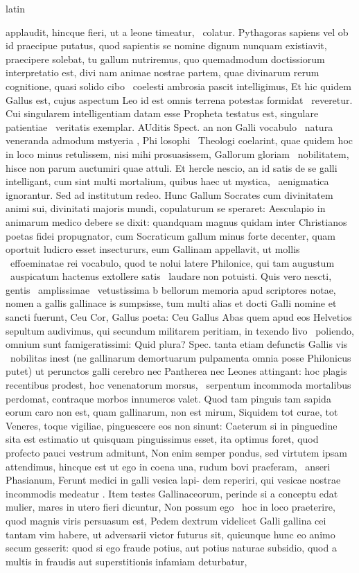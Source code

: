 \documentclass[12pt]{book}
\renewenvironment{latin}
    	{\begin{hyphenrules}{latin}}
    	{\end{hyphenrules}}
\begin{document}
\begin{pages}
\begin{latin}
\begin{Leftside}
applaudit, hincque fieri, ut a leone timeatur, ﻿\ampersand\ colatur. Pythagoras sapiens vel ob id praecipue putatus, quod sapientis se nomine dignum nunquam existiavit, praecipere solebat, tu gallum nutriremus, quo quemadmodum doctissiorum interpretatio est, divi nam animae nostrae partem, quae divinarum rerum cognitione, quasi solido cibo ﻿\ampersand\ coelesti ambrosia pascit intelligimus, Et hic quidem Gallus est, cujus aspectum Leo id est omnis terrena potestas formidat ﻿\ampersand\ reveretur. Cui singularem intelligentiam datam esse Propheta testatus est, singulare patientiae ﻿\ampersand\ veritatis exemplar. AUditis Spect. an non Galli vocabulo ﻿\ampersand\ natura veneranda admodum mstyeria , Phi   losophi ﻿\ampersand\ Theologi coelarint, quae quidem hoc in loco minus retulissem, nisi mihi prosuasissem, Gallorum gloriam ﻿\ampersand\ nobilitatem, hisce non parum auctumiri quae attuli. Et hercle nescio, an id satis de se galli intelligant, cum sint multi mortalium, quibus haec ut mystica, ﻿\ampersand\ aenigmatica ignorantur. Sed ad institutum redeo. Hunc Gallum Socrates cum divinitatem animi sui, divinitati majoris mundi, copulaturum se speraret: Aesculapio in animarum medico debere se dixit: quandquam magnus quidam inter Christianos poetas fidei propugnator, cum Socraticum gallum minus forte decenter, quam oportuit ludicro esset insectururs, eum Gallinam appellavit, ut mollis ﻿\ampersand\ effoeminatae rei vocabulo, quod te nolui latere Philonice, qui tam augustum ﻿\ampersand\ auspicatum hactenus extollere satis ﻿\ampersand\ laudare non potuisti. Quis vero nescti, gentis ﻿\ampersand\ amplissimae ﻿\ampersand\ vetustissima b bellorum memoria apud scriptores notae, nomen a gallis gallinace is sumpsisse, tum multi alias et docti Galli nomine et sancti fuerunt, Ceu Cor, Gallus poeta: Ceu Gallus Abas quem apud eos Helvetios sepultum audivimus, qui secundum militarem peritiam, in texendo livo ﻿\ampersand\ poliendo, omnium sunt famigeratissimi: Quid plura? Spec. tanta etiam defunctis Gallis vis ﻿\ampersand\ nobilitas inest (ne gallinarum demortuarum pulpamenta omnia posse Philonicus putet) ut perunctos galli cerebro nec Pantherea nec Leones attingant: hoc plagis recentibus prodest, hoc venenatorum morsus, ﻿\ampersand\ serpentum incommoda mortalibus perdomat, contraque morbos innumeros valet. Quod tam pinguis tam sapida eorum caro non est, quam gallinarum, non est mirum, Siquidem tot curae, tot Veneres, toque vigiliae, pinguescere eos non sinunt: Caeterum si in pinguedine sita est estimatio ut quisquam pinguissimus esset, ita optimus foret, quod profecto pauci vestrum admitunt, Non enim semper pondus, sed virtutem ipsam attendimus, hincque est ut ego in coena una, rudum bovi praeferam, ﻿\ampersand\ anseri Phasianum, Ferunt medici in galli vesica lapi-   dem reperiri, qui vesicae nostrae incommodis medeatur . Item testes Gallinaceorum, perinde si a conceptu edat mulier, mares in utero fieri dicuntur, Non possum ego ﻿\ampersand\ hoc in loco praeterire, quod magnis viris persuasum est, Pedem dextrum videlicet Galli gallina cei tantam vim habere, ut adversarii victor futurus sit, quicunque  hunc eo animo secum gesserit: quod si ego fraude potius, aut potius naturae subsidio, quod a multis in fraudis aut superstitionis infamiam deturbatur, 
\end{Leftside}
\end{latin}
\end{pages}
\end{document}
